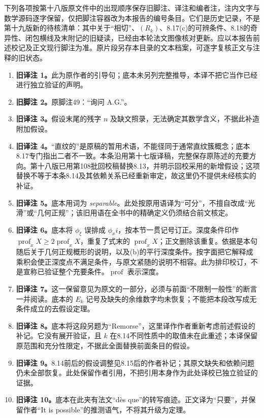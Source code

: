 下列各项按第十八版原文件中的出现顺序保存旧脚注、译注和编者注，注内文字与数学源码逐字保留，仅把脚注容器改为本报告的编号条目。它们是历史记录，不是第十九版新的待核清单：其中关于“相切”、$(R_k)$、8.17(c)的可辨条件、8.18的奇异性、闭包横线及末附记的旧疑读，已经由本轮法文图像核对更新。应以本报告前述校记及正文现行脚注为准。原片段另存本目录的文本档案，可逐字复核正文与注释的旧状态。
\begin{enumerate}
\item \textbf{旧译注 1。}此为原作者的引导句；底本未另列完整推导，本译不把它当作已经进行独立验证的声明。
\item \textbf{旧脚注 2。}原脚注49：“询问 A.G.”。
\item \textbf{旧译注 3。}假设末尾的残字 $n$ 及缺文照录，无法确定其数学含义，不据此补造附加假设。
\item \textbf{旧译注 4。}“直纹的”是原稿的暂用术语，不能径同于通常直纹簇概念；底本8.17专门指出二者不一致。本条沿用第十七版译稿，完整保存原陈述的充要方向。第十八版已用第108批回校稿替换8.13，并明示回校采用的新增假设；这项替换不等于本条8.14及其依赖关系已经重新审定，故这里仍不提供未经核实的补证。
\item \textbf{旧译注 5。}底本用词为 \emph{separable}。此处按原用语译为“可分”，不擅自改成“光滑”或“几何正规”；该旧用语在全书中的精确定义仍须结合前文核定。
\item \textbf{旧译注 6。}底本将 $\phi_\xi$ 误排成 $\phi_x i$，按本节一贯记号订正。深度条件印作 $\operatorname{prof}_x X\ge2\operatorname{prof}_x X$，重复了式末的 $\operatorname{prof}_x X$；正文删除该重复。依据是本句随后关于几何正规概形的说明，以及(b)的平行深度条件。按字面把它解释成乘积会使正深度点不满足条件，与原文紧随的说明不相容。此为排印校订，不是宣称已验证整个充要条件。$\operatorname{prof}$ 表示深度。
\item \textbf{旧译注 7。}这一保留意见为原文的一部分，必须与前面“不限制一般性”的断言一并阅读。底本的 $E_k$ 记号及缺失的余维数字均未恢复；不能把本段改写成无条件成立的去假设定理。
\item \textbf{旧译注 8。}底本将这段另题为“Remorse”，这里译作作者重新考虑前述假设的补记。它没有展开验证，且 $k$ 在8.14不同性质中的取值未在此重述；本译保留原范围和充分性限定，不据此全面替换前面条目的假设。
\item \textbf{旧译注 9。}8.14前后的假设调整见8.15后的作者补记；其原文缺失和依赖问题仍未全部恢复。此处保留作者引用，不把引用本身作为此处译校已独立验证的证据。
\item \textbf{旧译注 10。}底本在此夹有法文“dès que”的转写痕迹。正文译为“只要”，并保留作者“It is possible”的推测语气，不将其升级为定理。

\end{enumerate}
